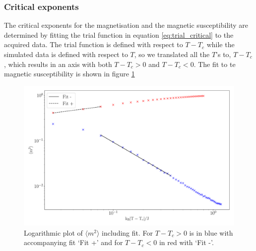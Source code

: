 \documentclass[a4paper,8pt]{article}
\begin{document}
\subsubsection{Critical exponents}
The critical exponents for the magnetisation and the magnetic susceptibility are determined by
fitting the trial function in equation \ref{eq:trial_critical} to the acquired data. The trial
function is defined with respect to $T - T_c$ while the simulated data is defined with respect to $T$, so we translated all the $T$'s to, $T - T_c$, which results in an axis with both $T - T_c > 0$ and  $T - T_c < 0$. The fit to te magnetic susceptibility is shown in figure \ref{fig:log_mag_spe}

\begin{figure}[htbp]
    \centering
    \includegraphics[scale = 0.3]{L40_SW_5000_magnetisation_fitted_log.pdf}
    \caption{Logarithmic plot of $\langle m^2 \rangle$ including fit. For $T - T_c > 0$ is in blue with accompanying fit ‘Fit +’ and for $T - T_c < 0$ in red with ‘Fit -’.}
    \label{fig:log_mag_spe}
\end{figure}
\end{document}
